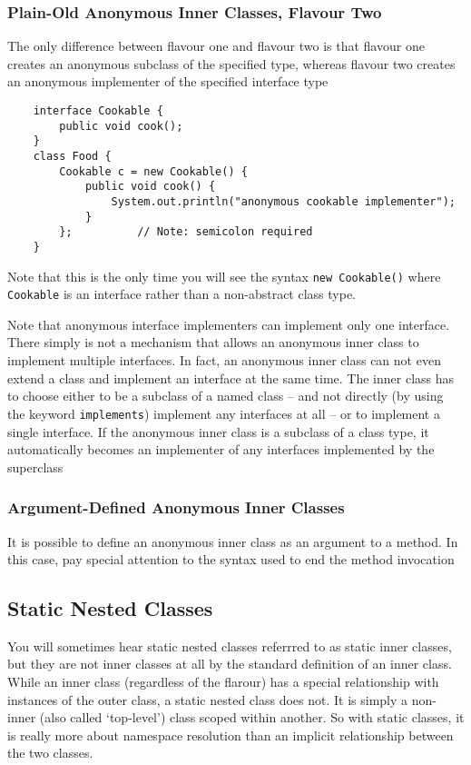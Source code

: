 \subsubsection{Plain-Old Anonymous Inner Classes, Flavour Two}
The only difference between flavour one and flavour two is that flavour one 
creates an anonymous subclass of the specified type, whereas flavour two 
creates an anonymous implementer of the specified interface type
\begin{verbatim}
    interface Cookable {
        public void cook();
    }
    class Food {
        Cookable c = new Cookable() {
            public void cook() {
                System.out.println("anonymous cookable implementer");
            }
        };          // Note: semicolon required
    }
\end{verbatim}
Note that this is the only time you will see the syntax \verb#new Cookable()# 
where \verb#Cookable# is an interface rather than a non-abstract class type.

Note that anonymous interface implementers can implement only one interface.  
There simply is not a mechanism that allows an anonymous inner class to 
implement multiple interfaces. In fact, an anonymous inner class can not even 
extend a class and implement an interface at the same time. The inner class has 
to choose either to be a subclass of a named class -- and not directly (by 
using the keyword \verb#implements#) implement any interfaces at all -- or to 
implement a single interface. If the anonymous inner class is a subclass of a 
class type, it automatically becomes an implementer of any interfaces 
implemented by the superclass

\subsubsection{Argument-Defined Anonymous Inner Classes}
It is possible to define an anonymous inner class as an argument to a method.  
In this case, pay special attention to the syntax used to end the method 
invocation

\subsection{Static Nested Classes}
You will sometimes hear static nested classes referrred to as static inner 
classes, but they are not inner classes at all by the standard definition of an 
inner class. While an inner class (regardless of the flarour) has a special 
relationship with instances of the outer class, a static nested class does not.
It is simply a non-inner (also called `top-level') class scoped within another.
So with static classes, it is really more about namespace resolution than an 
implicit relationship between the two classes.

